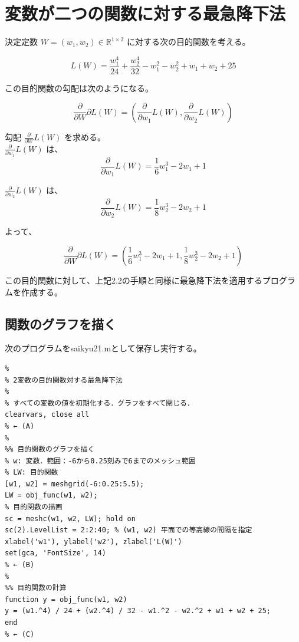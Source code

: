 \documentclass[10pt,a4paper,titlepage]{jreport} %
\begin{document}
\section{変数が二つの関数に対する最急降下法}

決定定数 $W = (w_1, w_2) \in \mathbb{R}^{1 \times 2} $ に対する次の目的関数を考える。

\begin{equation}
L(W) = \frac{w_1^4}{24} + \frac{w_2^4}{32} - w_1^2 - w_2^2 + w_1 + w_2 + 25
\end{equation}

この目的関数の勾配は次のようになる。

\begin{equation}
\frac{ \partial }{ \partial W} \partial L(W) = ( \frac{ \partial }{ \partial w_1 } L(W), \frac{ \partial }{ \partial w_2 } L(W))
\end{equation}

勾配 $ \frac{ \partial }{ \partial W } L(W) $ を求める。\\

$ \frac{ \partial }{ \partial w_1 } L(W) $ は、
\begin{equation}
\frac{ \partial }{ \partial w_1 } L(W) = \frac{1}{6} w_1^{3} - 2w_1 + 1
\end{equation}

$ \frac{ \partial }{ \partial w_2 } L(W) $ は、
\begin{equation}
\frac{ \partial }{ \partial w_2 } L(W) = \frac{1}{8} w_2^{3} - 2w_2 + 1
\end{equation}

よって、

\begin{equation}
\frac{ \partial }{ \partial W} \partial L(W) = ( \frac{1}{6} w_1^{3} - 2w_1 + 1, \frac{1}{8} w_2^{3} - 2w_2 + 1)
\end{equation}

この目的関数に対して、上記2.2の手順と同様に最急降下法を適用するプログラムを作成する。

\subsection{関数のグラフを描く}

次のプログラムをsaikyu21.mとして保存し実行する。

\begin{lstlisting}[caption=saikyu21]
% プログラム1.2: saikyu21.m
%
% 2変数の目的関数対する最急降下法
%
% すべての変数の値を初期化する．グラフをすべて閉じる．
clearvars, close all
% ← (A)
%
%% 目的関数のグラフを描く
% w: 変数．範囲：-6から0.25刻みで6までのメッシュ範囲
% LW: 目的関数
[w1, w2] = meshgrid(-6:0.25:5.5);
LW = obj_func(w1, w2);
% 目的関数の描画
sc = meshc(w1, w2, LW); hold on
sc(2).LevelList = 2:2:40; % (w1, w2) 平面での等高線の間隔を指定
xlabel('w1'), ylabel('w2'), zlabel('L(W)')
set(gca, 'FontSize', 14)
% ← (B)
%
%% 目的関数の計算
function y = obj_func(w1, w2)
y = (w1.^4) / 24 + (w2.^4) / 32 - w1.^2 - w2.^2 + w1 + w2 + 25;
end
% ← (C)
\end{lstlisting}
\end{document}
